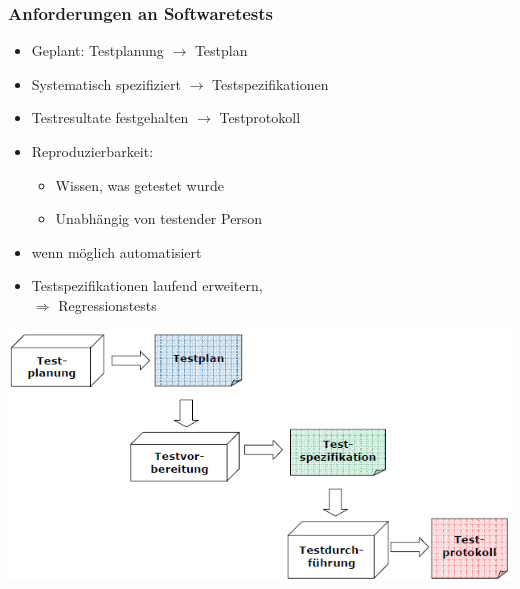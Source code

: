 \subsubsection{Anforderungen an Softwaretests}
	\begin{minipage}{10cm}
	\begin{itemize}
			\item Geplant: Testplanung $\rightarrow$ Testplan
			\item Systematisch spezifiziert $\rightarrow$ Testspezifikationen
			\item Testresultate festgehalten $\rightarrow$ Testprotokoll
			\item Reproduzierbarkeit:
			\begin{itemize}
				\item Wissen, was getestet wurde
				\item Unabhängig von testender Person
			\end{itemize}
			\item wenn möglich automatisiert
			\item Testspezifikationen laufend erweitern,\\
			$\Rightarrow$ Regressionstests
		\end{itemize}
	\end{minipage}
	\begin{minipage}{9cm}
		\includegraphics[width=\linewidth]{images/sofwaretest.png}
	\end{minipage}
\clearpage
\pagebreak

